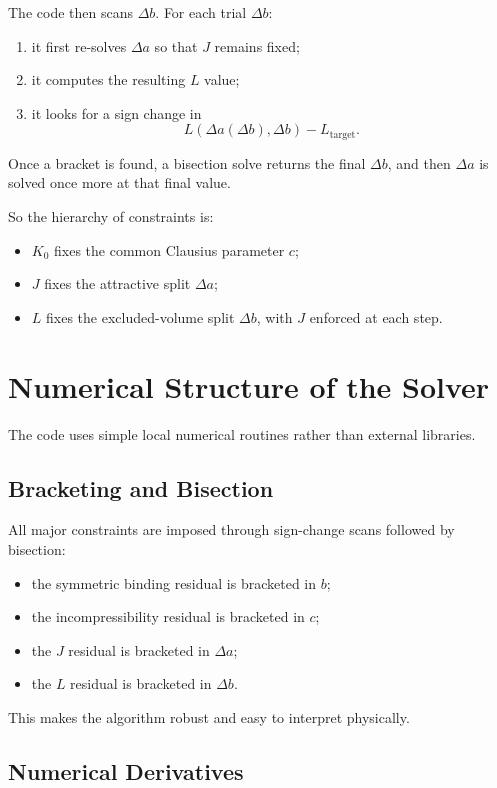 \documentclass[11pt]{article}
\begin{document}
The code then scans $\Delta b$. For each trial $\Delta b$:
\begin{enumerate}
\item it first re-solves $\Delta a$ so that $J$ remains fixed;
\item it computes the resulting $L$ value;
\item it looks for a sign change in
\[
L(\Delta a(\Delta b),\Delta b) - L_{\mathrm{target}}.
\]
\end{enumerate}

Once a bracket is found, a bisection solve returns the final $\Delta b$, and
then $\Delta a$ is solved once more at that final value.

So the hierarchy of constraints is:
\begin{itemize}
\item $K_0$ fixes the common Clausius parameter $c$;
\item $J$ fixes the attractive split $\Delta a$;
\item $L$ fixes the excluded-volume split $\Delta b$, with $J$ enforced at each
step.
\end{itemize}

\section{Numerical Structure of the Solver}

The code uses simple local numerical routines rather than external libraries.

\subsection{Bracketing and Bisection}

All major constraints are imposed through sign-change scans followed by
bisection:
\begin{itemize}
\item the symmetric binding residual is bracketed in $b$;
\item the incompressibility residual is bracketed in $c$;
\item the $J$ residual is bracketed in $\Delta a$;
\item the $L$ residual is bracketed in $\Delta b$.
\end{itemize}

This makes the algorithm robust and easy to interpret physically.

\subsection{Numerical Derivatives}
\end{document}
